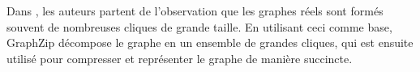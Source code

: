 	
	Dans \citep{rossi2018graphzip}, les auteurs partent de l'observation que les graphes réels sont formés souvent de nombreuses cliques de grande taille. En utilisant ceci comme base, GraphZip décompose le graphe en un ensemble de grandes cliques, qui est ensuite utilisé pour compresser et représenter le graphe de manière succincte. 